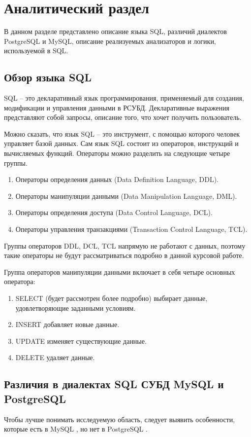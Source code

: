 \chapter{Аналитический раздел}

В данном разделе представлено описание языка SQL, различий диалектов PostgreSQL и MySQL, описание реализуемых анализаторов и логики, используемой в SQL.

\section{Обзор языка SQL}
SQL -- это декларативный язык программирования, применяемый для создания, модификации и управления данными в РСУБД. Декларативные выражения представляют собой запросы, описание того, что хочет получить пользователь.

Можно сказать, что язык SQL -- это инструмент, с помощью которого человек управляет базой данных. Сам язык SQL состоит из операторов, инструкций и вычисляемых функций. Операторы можно разделить на следующие четыре группы.

\begin{enumerate}
	\item Операторы определения данных (Data Definition Language, DDL).
	\item Операторы манипуляции данными (Data Manipulation Language, DML).
	\item Операторы определения доступа (Data Control Language, DCL).
	\item Операторы управления транзакциями (Transaction Control Language, TCL).
\end{enumerate}

Группы операторов DDL, DCL, TCL напрямую не работают с данных, поэтому такие операторы не будут рассматриваться подробно в данной курсовой работе.

Группа операторов манипуляции данными включает в себя четыре основных оператора:
\begin{enumerate}
	\item SELECT (будет рассмотрен более подробно) выбирает данные, удовлетворяющие заданными условиям.
	\item INSERT добавляет новые данные.
	\item UPDATE изменяет существующие данные.
	\item DELETE удаляет данные.
\end{enumerate}

\section{Различия в диалектах SQL СУБД \newline MySQL и PostgreSQL}
Чтобы лучше понимать исследуемую область, следует выявить особенности, которые есть в MySQL \cite{mysql-standard}, но нет в PostgreSQL \cite{postgresql-standard}.

